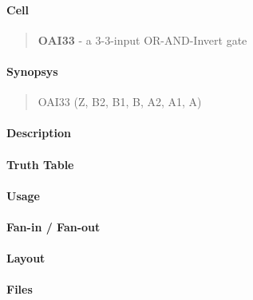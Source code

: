 \label{OAI33}
\paragraph{Cell}
\begin{quote}
    \textbf{OAI33} - a 3-3-input OR-AND-Invert gate
\end{quote}

\paragraph{Synopsys}
\begin{quote}
    OAI33 (Z, B2, B1, B, A2, A1, A)
\end{quote}

\paragraph{Description}

%

\paragraph{Truth Table}
%

\paragraph{Usage}

\paragraph{Fan-in / Fan-out}

\paragraph{Layout}

\paragraph{Files}

